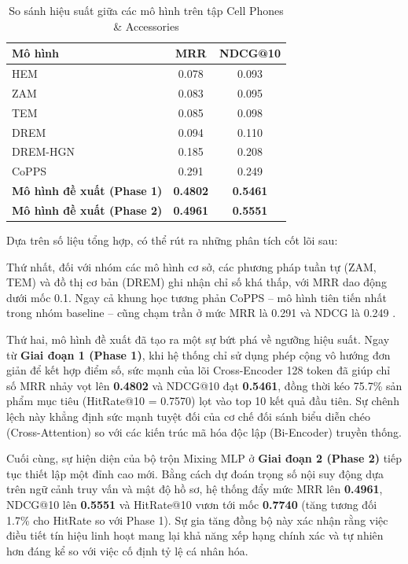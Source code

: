 \begin{table}[htbp]
\centering
\caption{So sánh hiệu suất giữa các mô hình trên tập Cell Phones \& Accessories}
\label{tab:performance_comparison}
\renewcommand{\arraystretch}{1.2}
\begin{tabular}{|l|c|c|}
\hline
\textbf{Mô hình} & \textbf{MRR} & \textbf{NDCG@10} \\ \hline
HEM & 0.078 & 0.093 \\ \hline
ZAM & 0.083 & 0.095 \\ \hline
TEM & 0.085 & 0.098 \\ \hline
DREM & 0.094 & 0.110 \\ \hline
DREM-HGN & 0.185 & 0.208 \\ \hline
CoPPS & 0.291 & 0.249 \\ \hline
\textbf{Mô hình đề xuất (Phase 1)} & \textbf{0.4802} & \textbf{0.5461} \\ \hline
\textbf{Mô hình đề xuất (Phase 2)} & \textbf{0.4961} & \textbf{0.5551} \\ \hline
\end{tabular}
\end{table}

Dựa trên số liệu tổng hợp, có thể rút ra những phân tích cốt lõi sau:

Thứ nhất, đối với nhóm các mô hình cơ sở, các phương pháp tuần tự (ZAM, TEM) và đồ thị cơ bản (DREM) ghi nhận chỉ số khá thấp, với MRR dao động dưới mốc 0.1. Ngay cả khung học tương phản CoPPS – mô hình tiên tiến nhất trong nhóm baseline – cũng chạm trần ở mức MRR là 0.291 và NDCG là 0.249 \cite{23}. 

Thứ hai, mô hình đề xuất đã tạo ra một sự bứt phá về ngưỡng hiệu suất. Ngay từ \textbf{Giai đoạn 1 (Phase 1)}, khi hệ thống chỉ sử dụng phép cộng vô hướng đơn giản để kết hợp điểm số, sức mạnh của lõi Cross-Encoder 128 token đã giúp chỉ số MRR nhảy vọt lên \textbf{0.4802} và NDCG@10 đạt \textbf{0.5461}, đồng thời kéo 75.7\% sản phẩm mục tiêu (HitRate@10 = 0.7570) lọt vào top 10 kết quả đầu tiên. Sự chênh lệch này khẳng định sức mạnh tuyệt đối của cơ chế đối sánh biểu diễn chéo (Cross-Attention) so với các kiến trúc mã hóa độc lập (Bi-Encoder) truyền thống.

Cuối cùng, sự hiện diện của bộ trộn Mixing MLP ở \textbf{Giai đoạn 2 (Phase 2)} tiếp tục thiết lập một đỉnh cao mới. Bằng cách dự đoán trọng số nội suy động dựa trên ngữ cảnh truy vấn và mật độ hồ sơ, hệ thống đẩy mức MRR lên \textbf{0.4961}, NDCG@10 lên \textbf{0.5551} và HitRate@10 vươn tới mốc \textbf{0.7740} (tăng tương đối 1.7\% cho HitRate so với Phase 1). Sự gia tăng đồng bộ này xác nhận rằng việc điều tiết tín hiệu linh hoạt mang lại khả năng xếp hạng chính xác và tự nhiên hơn đáng kể so với việc cố định tỷ lệ cá nhân hóa.


